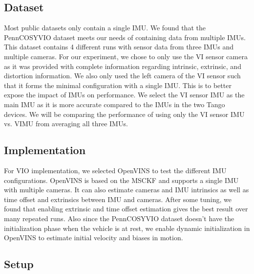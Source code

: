 \documentclass[conference]{IEEEtran}
\begin{document}
\subsection{Dataset}

Most public datasets only contain a single IMU. We found that the PennCOSYVIO dataset \cite{penncosyvio} meets our needs of containing data from multiple IMUs. This dataset contains 4 different runs with sensor data from three IMUs and multiple cameras. For our experiment, we chose to only use the VI sensor camera as it was provided with complete information regarding intrinsic, extrinsic, and distortion information. We also only used the left camera of the VI sensor such that it forms the minimal configuration with a single IMU. This is to better expose the impact of IMUs on performance. We select the VI sensor IMU as the main IMU as it is more accurate compared to the IMUs in the two Tango devices. We will be comparing the performance of using only the VI sensor IMU vs. VIMU from averaging all three IMUs.

\subsection{Implementation}

For VIO implementation, we selected OpenVINS \cite{openvins} to test the different IMU configurations. OpenVINS is based on the MSCKF and supports a single IMU with multiple cameras. It can also estimate cameras and IMU intrinsics as well as time offset and extrinsics between IMU and cameras. After some tuning, we found that enabling extrinsic and time offset estimation gives the best result over many repeated runs. Also since the PennCOSYVIO dataset doesn't have the initialization phase when the vehicle is at rest, we enable dynamic initialization in OpenVINS to estimate initial velocity and biases in motion.

\subsection{Setup}
\end{document}
